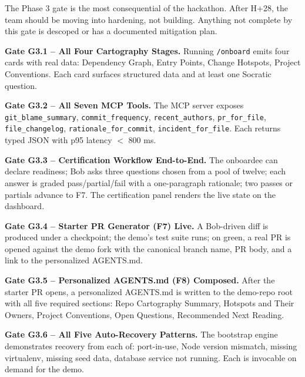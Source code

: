 \documentclass[11pt,letterpaper]{article}
\begin{document}
The Phase 3 gate is the most consequential of the hackathon. After H+28, the team should be moving into hardening, not building. Anything not complete by this gate is descoped or has a documented mitigation plan.

\begin{gate}
\textbf{Gate G3.1 -- All Four Cartography Stages.} Running \texttt{/onboard} emits four cards with real data: Dependency Graph, Entry Points, Change Hotspots, Project Conventions. Each card surfaces structured data and at least one Socratic question.
\end{gate}

\begin{gate}
\textbf{Gate G3.2 -- All Seven MCP Tools.} The MCP server exposes \texttt{git\_blame\_summary}, \texttt{commit\_frequency}, \texttt{recent\_authors}, \texttt{pr\_for\_file}, \texttt{file\_changelog}, \texttt{rationale\_for\_commit}, \texttt{incident\_for\_file}. Each returns typed JSON with p95 latency $<$ 800 ms.
\end{gate}

\begin{gate}
\textbf{Gate G3.3 -- Certification Workflow End-to-End.} The onboardee can declare readiness; Bob asks three questions chosen from a pool of twelve; each answer is graded pass/partial/fail with a one-paragraph rationale; two passes or partials advance to F7. The certification panel renders the live state on the dashboard.
\end{gate}

\begin{gate}
\textbf{Gate G3.4 -- Starter PR Generator (F7) Live.} A Bob-driven diff is produced under a checkpoint; the demo's test suite runs; on green, a real PR is opened against the demo fork with the canonical branch name, PR body, and a link to the personalized AGENTS.md.
\end{gate}

\begin{gate}
\textbf{Gate G3.5 -- Personalized AGENTS.md (F8) Composed.} After the starter PR opens, a personalized AGENTS.md is written to the demo-repo root with all five required sections: Repo Cartography Summary, Hotspots and Their Owners, Project Conventions, Open Questions, Recommended Next Reading.
\end{gate}

\begin{gate}
\textbf{Gate G3.6 -- All Five Auto-Recovery Patterns.} The bootstrap engine demonstrates recovery from each of: port-in-use, Node version mismatch, missing virtualenv, missing seed data, database service not running. Each is invocable on demand for the demo.
\end{gate}
\end{document}
